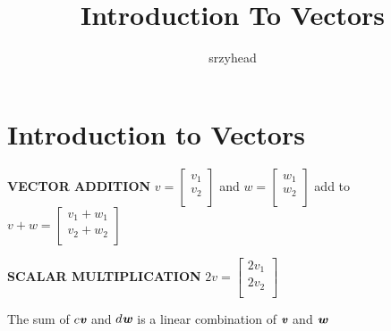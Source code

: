 \documentclass[UTF8]{article}
\author {srzyhead}
\title {Introduction To Vectors}
\begin{document}
\maketitle
\section{Introduction to Vectors}

\textbf{VECTOR ADDITION} $
v =
\begin{bmatrix}
v_1 \\
v_2 \\
\end{bmatrix}
$ and $
w =
\begin{bmatrix}
w_1 \\
w_2 \\
\end{bmatrix}
$ add to $
v + w = \begin{bmatrix}
v_1 + w_1 \\
v_2 + w_2 \\
\end{bmatrix}
$

\textbf{SCALAR MULTIPLICATION} $
2v =
\begin{bmatrix}
2v_1 \\
2v_2 \\
\end{bmatrix}
$

The sum of $c\textit{\textbf{v}}$ and $d\textit{\textbf{w}}$ is a linear combination of $\textit{\textbf{v}}$ and $\textit{\textbf{w}}$
\end{document}
